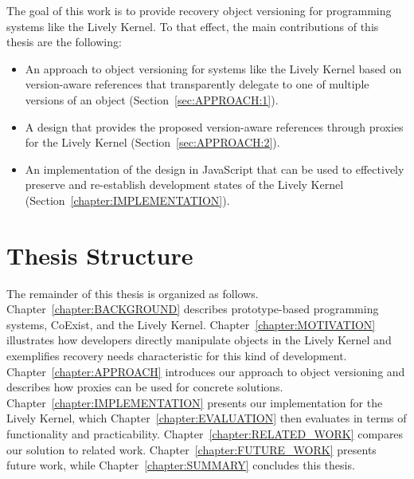 The goal of this work is to provide recovery object versioning for programming systems like the Lively Kernel.
To that effect, the main contributions of this thesis are the following:

\begin{itemize}
    \item An approach to object versioning for systems like the Lively Kernel based on version-aware references that transparently delegate to one of multiple versions of an object (Section~\ref{sec:APPROACH:1}).
    \item A design that provides the proposed version-aware references through proxies for the Lively Kernel (Section~\ref{sec:APPROACH:2}).
    \item An implementation of the design in JavaScript that can be used to effectively preserve and re-establish development states of the Lively Kernel (Section~\ref{chapter:IMPLEMENTATION}).
\end{itemize}


\section{Thesis Structure}

The remainder of this thesis is organized as follows. 
Chapter~\ref{chapter:BACKGROUND} describes prototype-based programming systems, CoExist, and the Lively Kernel.
Chapter~\ref{chapter:MOTIVATION} illustrates how developers directly manipulate objects in the Lively Kernel and exemplifies recovery needs characteristic for this kind of development.
Chapter~\ref{chapter:APPROACH} introduces our approach to object versioning and describes how proxies can be used for concrete solutions.
Chapter~\ref{chapter:IMPLEMENTATION} presents our implementation for the Lively Kernel, which Chapter~\ref{chapter:EVALUATION} then evaluates in terms of functionality and practicability.
Chapter~\ref{chapter:RELATED_WORK} compares our solution to related work.
Chapter~\ref{chapter:FUTURE_WORK} presents future work, while Chapter~\ref{chapter:SUMMARY} concludes this thesis.
